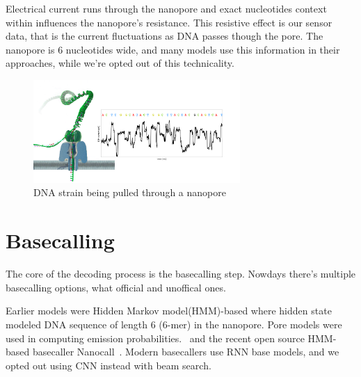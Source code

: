 \documentclass[runningheads,a4paper]{llncs}
\begin{document}
Electrical current runs through the nanopore and exact nucleotides context within influences the nanopore's resistance. This resistive effect is our sensor data, that is the current fluctuations as DNA passes though the pore. The nanopore is 6 nucleotides wide, and many models use this information in their approaches, while we're opted out of this technicality.


\begin{figure}[!ht]
	\begin{center}
		\includegraphics[width=0.7\textwidth]{./imgs/nanopore.png}
		\caption[DNA strain being pulled through a nanopore]{DNA strain being pulled through a nanopore \protect\footnotemark}
		\label{fg:nanopore}
	\end{center}
\end{figure}

\section{Basecalling}

The core of the decoding process is the basecalling step. Nowdays there's multiple basecalling options, what official and unoffical ones.

Earlier models were Hidden Markov model(HMM)-based where hidden state modeled DNA sequence of length 6 (6-mer) in the nanopore. Pore models were used in computing emission probabilities.~\cite{loman2015complete,schreiber2015analysis,szalay2015novo,timp2012dna} and the recent open source HMM-based basecaller Nanocall~\cite{david2016nanocall}. Modern basecallers use RNN base models, and we opted out using CNN instead with beam search.
\end{document}
